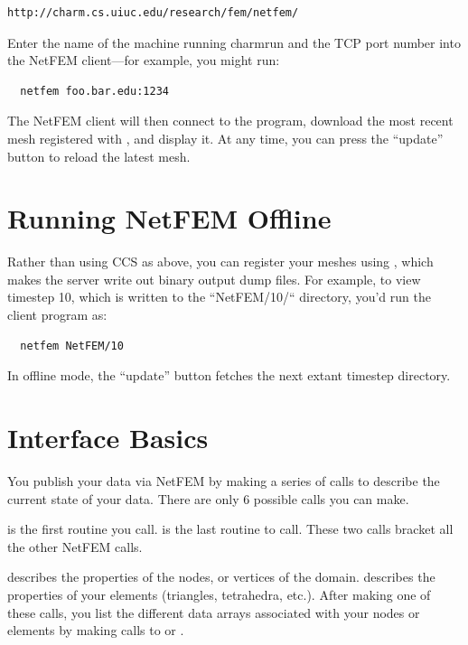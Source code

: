 \documentclass[10pt]{article}
\begin{document}
\begin{verbatim}
http://charm.cs.uiuc.edu/research/fem/netfem/
\end{verbatim}

Enter the name of the machine running charmrun and
the TCP port number into the NetFEM client---for example, 
you might run:

\begin{verbatim}
  netfem foo.bar.edu:1234
\end{verbatim}

The NetFEM client will then connect to the program,
download the most recent mesh registered with 
, and display it.
At any time, you can press the ``update'' button 
to reload the latest mesh.


\section{Running NetFEM Offline}

Rather than using CCS as above, you can register your meshes
using , which makes the server write out 
binary output dump files.  For example, to view timestep 10,
which is written to the ``NetFEM/10/`` directory, you'd 
run the client program as:

\begin{verbatim}
  netfem NetFEM/10
\end{verbatim}

In offline mode, the ``update'' button fetches the next
extant timestep directory.

\section{Interface Basics}

You publish your data via NetFEM by making a series of
calls to describe the current state of your data.  
There are only 6 possible calls you can make.

 is the first routine you call.
 is the last routine to call.  These
two calls bracket all the other NetFEM calls.

 describes the properties of the
nodes, or vertices of the domain.  
describes the properties of your elements (triangles,
tetrahedra, etc.).  After making one of these calls,
you list the different data arrays associated with your 
nodes or elements by making calls to  
or .
\end{document}
